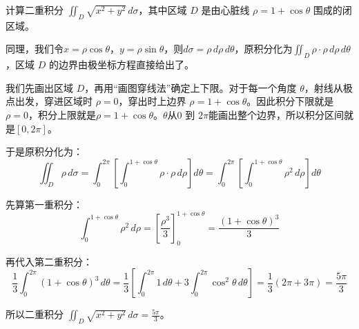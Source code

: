 \begin{myexample}
    计算二重积分 \(\iint_D \sqrt{x^2+y^2}\,d\sigma\)，其中区域 \(D\) 是由心脏线 \(\rho=1+\cos\theta\) 围成的闭区域。

    同理，我们令$x = \rho\cos\theta$，$y = \rho\sin\theta$，则$d\sigma = \rho\,d\rho\,d\theta$，原积分化为$\iint_D \rho \cdot \rho\,d\rho\,d\theta$，区域 \(D\) 的边界由极坐标方程直接给出了。

    我们先画出区域 \(D\)，再用“画图穿线法”确定上下限。对于每一个角度 \(\theta\)，射线从极点出发，穿进区域时 \(\rho=0\)，穿出时上边界 \(\rho=1+\cos\theta\)。因此积分下限就是\(\rho=0\)，积分上限就是\(\rho=1+\cos\theta\)。\(\theta\)从\(0\) 到 \(2\pi\)能画出整个边界，所以积分区间就是$[0,2\pi]$。

    \begin{center}
    \end{center}

    于是原积分化为：
    \[
    \iint_D \rho\,d\sigma = \int_0^{2\pi}\left[\int_0^{1+\cos\theta} \rho\cdot \rho\,d\rho\right]d\theta
    = \int_0^{2\pi}\left[\int_0^{1+\cos\theta} \rho^2\,d\rho\right]d\theta
    \]

    先算第一重积分：
    \[
    \int_0^{1+\cos\theta} \rho^2\,d\rho = \left[\frac{\rho^3}{3}\right]_0^{1+\cos\theta} = \frac{(1+\cos\theta)^3}{3}
    \]

    再代入第二重积分：
    \[
    \frac13\int_0^{2\pi} (1+\cos\theta)^3\,d\theta = \frac13\left[\int_0^{2\pi}1\,d\theta + 3\int_0^{2\pi}\cos^2\theta\,d\theta\right]
    = \frac13(2\pi + 3\pi) = \frac{5\pi}{3}
    \]

    所以二重积分 \(\iint_D \sqrt{x^2+y^2}\,d\sigma = \frac{5\pi}{3}\)。
\end{myexample}

